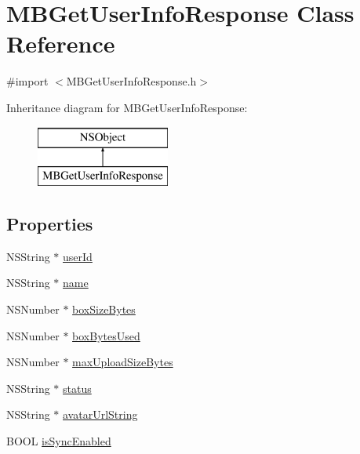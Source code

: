 \hypertarget{interface_m_b_get_user_info_response}{\section{M\-B\-Get\-User\-Info\-Response Class Reference}
\label{interface_m_b_get_user_info_response}
}


{\ttfamily \#import $<$M\-B\-Get\-User\-Info\-Response.\-h$>$}

Inheritance diagram for M\-B\-Get\-User\-Info\-Response\-:\begin{figure}[H]
\begin{center}
\leavevmode
\includegraphics[height=2.000000cm]{interface_m_b_get_user_info_response}
\end{center}
\end{figure}
\subsection*{Properties}
\begin{DoxyCompactItemize}
\item 
N\-S\-String $\ast$ \hyperlink{interface_m_b_get_user_info_response_a25211835b4b5dff492e975e6231df626}{user\-Id}
\item 
N\-S\-String $\ast$ \hyperlink{interface_m_b_get_user_info_response_a4b93d352d2fca75b34e1b5a50e03f587}{name}
\item 
N\-S\-Number $\ast$ \hyperlink{interface_m_b_get_user_info_response_a5f0c26ade8cb0b15f1067b38c019ce7a}{box\-Size\-Bytes}
\item 
N\-S\-Number $\ast$ \hyperlink{interface_m_b_get_user_info_response_acb7add7d0302f772a6129c0051613c31}{box\-Bytes\-Used}
\item 
N\-S\-Number $\ast$ \hyperlink{interface_m_b_get_user_info_response_a05bf0a718069ae9578677ffa56810faa}{max\-Upload\-Size\-Bytes}
\item 
N\-S\-String $\ast$ \hyperlink{interface_m_b_get_user_info_response_ac2acf327011ce6ed9e26a41ceddaee31}{status}
\item 
N\-S\-String $\ast$ \hyperlink{interface_m_b_get_user_info_response_a561dafa784b88045a1660b62565aa4ed}{avatar\-Url\-String}
\item 
B\-O\-O\-L \hyperlink{interface_m_b_get_user_info_response_ad96023d6090470b8b69b65e4e82361d0}{is\-Sync\-Enabled}
\end{DoxyCompactItemize}


